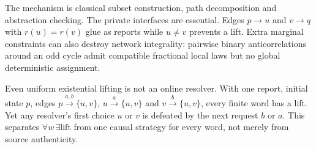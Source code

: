 \documentclass[11pt]{article}
\begin{document}
The mechanism is classical subset construction, path decomposition and
abstraction checking. The private interfaces are essential. Edges $p\to u$
and $v\to q$ with $r(u)=r(v)$ glue as reports while $u\ne v$ prevents a lift.
Extra marginal constraints can also destroy network integrality: pairwise
binary anticorrelations around an odd cycle admit compatible fractional local
laws but no global deterministic assignment.

Even uniform existential lifting is not an online resolver. With one report,
initial state $p$, edges $p\xrightarrow{a,b}\{u,v\}$,
$u\xrightarrow a\{u,v\}$ and $v\xrightarrow b\{u,v\}$, every finite word
has a lift. Yet any resolver's first choice $u$ or $v$ is defeated by the
next request $b$ or $a$. This separates $\forall w\,\exists\text{lift}$
from one causal strategy for every word, not merely from source authenticity.
\end{document}
